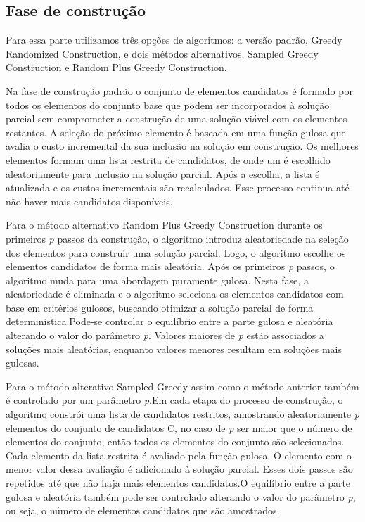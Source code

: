 \documentclass{article}
\begin{document}
\subsection{Fase de construção}

Para essa parte utilizamos três opções de algoritmos: a versão padrão, Greedy Randomized Construction, e dois métodos alternativos, Sampled Greedy Construction e Random Plus Greedy Construction.

Na fase de construção padrão o conjunto de elementos candidatos é formado por todos os elementos do conjunto base que podem ser incorporados à solução parcial sem comprometer a construção de uma solução viável com os elementos restantes. A seleção do próximo elemento é baseada em uma função gulosa que avalia o custo incremental da sua inclusão na solução em construção. Os melhores elementos formam uma lista restrita de candidatos, de onde um é escolhido aleatoriamente para inclusão na solução parcial. Após a escolha, a lista é atualizada e os custos incrementais são recalculados. Esse processo continua até não haver mais candidatos disponíveis.

Para o método alternativo Random Plus Greedy Construction  durante os primeiros \textit{p} passos da construção, o algoritmo introduz aleatoriedade na seleção dos elementos para construir uma solução parcial. Logo, o algoritmo escolhe os elementos candidatos de forma mais aleatória. Após os primeiros \textit{p} passos, o algoritmo muda para uma abordagem puramente gulosa. Nesta fase, a aleatoriedade é eliminada e o algoritmo seleciona os elementos candidatos com base em critérios gulosos, buscando otimizar a solução parcial de forma determinística.Pode-se controlar o equilíbrio entre a parte gulosa e aleatória alterando o valor do parâmetro \textit{p}. Valores maiores de \textit{p} estão associados a soluções mais aleatórias, enquanto valores menores resultam em soluções mais gulosas.

Para o método alterativo Sampled Greedy assim como o método anterior também é  controlado por um parâmetro \textit{p}.Em cada etapa do processo de construção, o algoritmo constrói uma lista de candidatos restritos, amostrando aleatoriamente \textit{p} elementos do conjunto de candidatos C, no caso de \textit{p} ser maior que o número de elementos do conjunto, então todos os elementos do conjunto são selecionados. Cada elemento da lista restrita é avaliado pela função gulosa. O elemento com o menor valor dessa avaliação é adicionado à solução parcial. Esses dois passos são repetidos até que não haja mais elementos candidatos.O equilíbrio entre a parte gulosa e aleatória também pode ser controlado alterando o valor do parâmetro \textit{p}, ou seja, o número de elementos candidatos que são amostrados.
\end{document}
